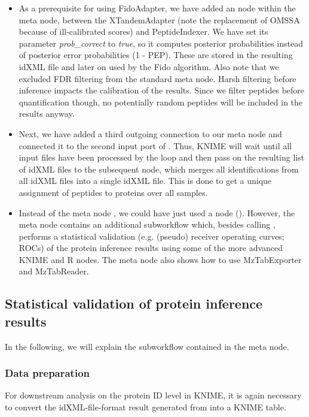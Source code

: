 \begin{itemize}
\item As a prerequisite for using FidoAdapter, we have added an  node within 
the  meta node, between the
XTandemAdapter (note the replacement of OMSSA because of ill-calibrated scores) and PeptideIndexer. We have set its 
parameter \textit{prob\_correct} to \textit{true}, so it computes posterior probabilities instead
of posterior error probabilities (1 - PEP). These are stored in the resulting idXML file and later on used by the 
Fido algorithm. Also note that we excluded FDR filtering from the standard meta node. Harsh filtering before 
inference impacts the calibration of the results. Since we filter peptides before quantification though, no 
potentially random peptides will be included in the results anyway.
\item Next, we have added a third outgoing connection to our  meta node and connected it to the second 
input port of .
Thus, KNIME will wait until all input files have been processed by the loop and then pass on the resulting list of 
idXML files to the subsequent
 node, which merges all identifications from all idXML files into a single idXML file. This is 
done to get a unique assignment of peptides to proteins over all samples.
\item Instead of the meta node , we could have just used a 
 node
(). However, the meta node contains an additional subworkflow which, 
besides calling ,
performs a statistical validation (e.g. (pseudo) receiver operating curves; ROCs) of the protein inference results 
using some of the more advanced KNIME and R nodes.
The meta node also shows how to use MzTabExporter and MzTabReader.
\end{itemize}

\subsection{Statistical validation of protein inference results}

In the following, we will explain the subworkflow contained in the  meta node.

\subsubsection{Data preparation}
For downstream analysis on the protein ID level in KNIME, it is again necessary to convert the idXML-file-format result generated from  into a KNIME table.

